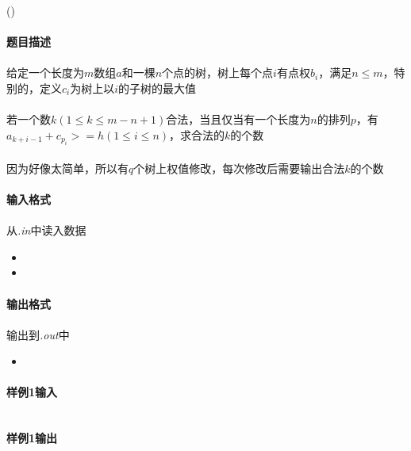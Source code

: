 \documentclass[UTF8]{ctexart}
\begin{document}
\begin{center}
	\large{()}
\end{center}
\paragraph{题目描述}
\paragraph{}给定一个长度为$m$数组$a$和一棵$n$个点的树，树上每个点$i$有点权$b_i$，满足$n\leq m$，特别的，定义$c_i$为树上以$i$的子树的最大值
\paragraph{}若一个数$k(1\leq k\leq m-n+1)$合法，当且仅当有一个长度为$n$的排列$p$，有$a_{k+i-1}+c_{p_i}>=h(1\leq i\leq n)$，求合法的$k$的个数
\paragraph{}因为好像太简单，所以有$q$个树上权值修改，每次修改后需要输出合法$k$的个数
\paragraph{输入格式}
\paragraph{}从\emph{.in}中读入数据
\begin{itemize}
	\item 
	\item 
\end{itemize}
\paragraph{输出格式}
\paragraph{}输出到\emph{.out}中
\begin{itemize}
	\item 
\end{itemize}
\clearpage
\paragraph{样例1输入}
\begin{lstlisting}
\end{lstlisting}
\paragraph{样例1输出}
\begin{lstlisting}
\end{lstlisting}
\end{document}
